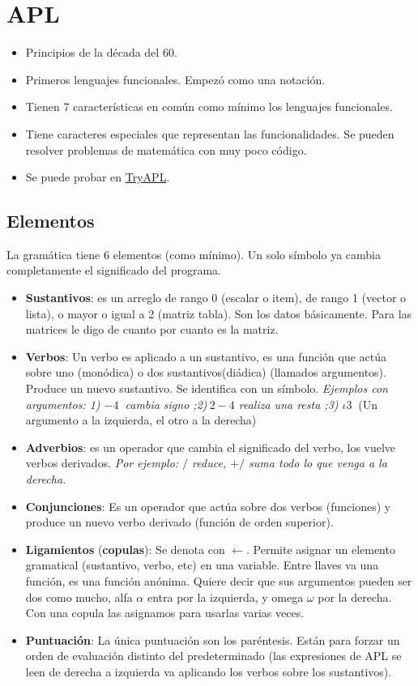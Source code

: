 \section{APL}
\begin{itemize}
\item Principios de la década del 60.
\item Primeros lenguajes funcionales. Empezó como una notación.
\item Tienen 7 características en común como mínimo los lenguajes funcionales.
\item Tiene caracteres especiales que representan las funcionalidades. Se pueden resolver problemas de matemática con muy poco código.
\item Se puede probar en \href{https://tryapl.org/}{TryAPL}.
\end{itemize}

\subsection*{Elementos}
La gramática tiene 6 elementos (como mínimo). Un solo símbolo ya cambia completamente el significado del programa.
\begin{itemize}
\item \textbf{Sustantivos}: es un arreglo de rango 0 (escalar o item), de rango 1 (vector o lista), o mayor o igual a 2 (matriz tabla). Son los datos básicamente. Para las matrices le digo de cuanto por cuanto es la matriz.
\item \textbf{Verbos}: Un verbo es aplicado a un sustantivo, es una función que actúa sobre uno (monódica) o dos sustantivos(diádica) (llamados argumentos). Produce un nuevo sustantivo. Se identifica con un símbolo. \textit{Ejemplos con argumentos: 1) $-4 \ $ cambia signo ;2)$\ 2-4$ realiza una resta ;3) $\iota3 \ $} (Un argumento a la izquierda, el otro a la derecha)
\item \textbf{Adverbios}: es un operador que cambia el significado del verbo, los vuelve verbos derivados. \textit{Por ejemplo: $/$ reduce, $+/$ suma todo lo que venga a la derecha.}
\item \textbf{Conjunciones}: Es un operador que actúa sobre dos verbos (funciones) y produce un nuevo verbo derivado (función de orden superior).
\item \textbf{Ligamientos} (\textbf{copulas}): Se denota con $\leftarrow$. Permite asignar un elemento gramatical (sustantivo, verbo, etc) en una variable. Entre llaves va una función, es una función anónima. Quiere decir que sus argumentos pueden ser dos como mucho, alfa $ \alpha $ entra por la izquierda, y omega $\omega$ por la derecha. Con una copula las asignamos para usarlas varias veces.
\item \textbf{Puntuación}: La única puntuación son los paréntesis. Están para forzar un orden de evaluación distinto del predeterminado (las expresiones de APL se leen de derecha a izquierda va aplicando los verbos sobre los sustantivos).
\end{itemize}

